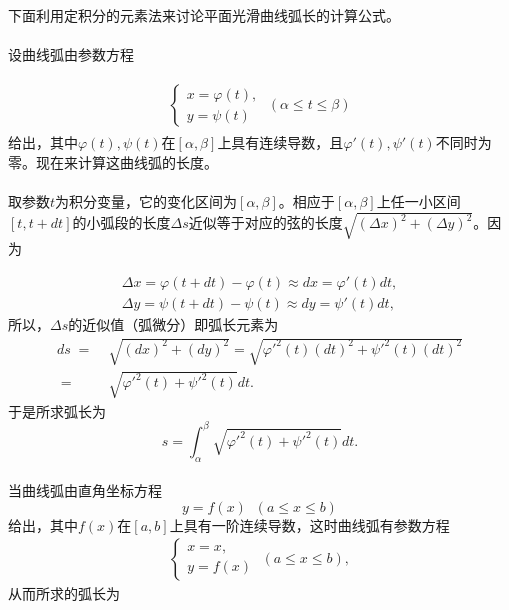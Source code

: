 \paragraph{}
下面利用定积分的元素法来讨论平面光滑曲线弧长的计算公式。

\paragraph{}
设曲线弧由参数方程

\begin{align}
\begin{split}
  \left\{\begin{array}{l} x=\varphi(t), \\ y = \psi(t) \end{array}\right. \; (\alpha \leq t \leq \beta)
\end{split}
\end{align}
给出，其中$\varphi(t), \psi(t)$在$[\alpha,\beta]$上具有连续导数，且$\varphi'(t), \psi'(t)$不同时为零。现在来计算这曲线弧的长度。

\paragraph{}
取参数$t$为积分变量，它的变化区间为$[\alpha,\beta]$。相应于$[\alpha,\beta]$上任一小区间$[t,t+dt]$的小弧段的长度$\Delta s$近似等于对应的弦的长度$\sqrt{(\Delta x)^2 + (\Delta y)^2}$。因为

\begin{align}
  \Delta x = \varphi(t+dt)-\varphi(t) \approx dx = \varphi'(t)dt, \\
  \Delta y = \psi(t+dt)-\psi(t) \approx dy = \psi'(t)dt,
\end{align}
所以，$\Delta s$的近似值（弧微分）即弧长元素为
\begin{align}
  ds \;=&\; \sqrt{(dx)^2 + (dy)^2} = \sqrt{\varphi'^2(t)(dt)^2 + \psi'^2(t)(dt)^2} \\
  \;=&\; \sqrt{\varphi'^2(t) + \psi'^2(t)}dt.
\end{align}
于是所求弧长为
\begin{equation}
  s = \int_\alpha^\beta\sqrt{\varphi'^2(t) + \psi'^2(t)}dt.
\end{equation}

\paragraph{}
当曲线弧由直角坐标方程
\begin{equation}
  y=f(x) \;\; (a \leq x \leq b)
\end{equation}
给出，其中$f(x)$在$[a,b]$上具有一阶连续导数，这时曲线弧有参数方程
\begin{align}
  \left\{\begin{array}{l}
    x = x, \\
    y = f(x)
  \end{array} \right. \; (a\leq x \leq b),
\end{align}
从而所求的弧长为

